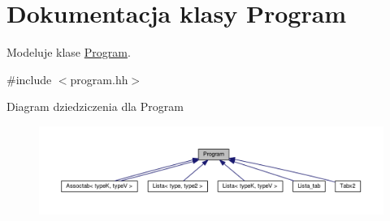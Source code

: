 \hypertarget{class_program}{\section{Dokumentacja klasy Program}
\label{class_program}
}


Modeluje klase \hyperlink{class_program}{Program}.  




{\ttfamily \#include $<$program.\-hh$>$}



Diagram dziedziczenia dla Program
\nopagebreak
\begin{figure}[H]
\begin{center}
\leavevmode
\includegraphics[width=350pt]{class_program__inherit__graph}
\end{center}
\end{figure}
